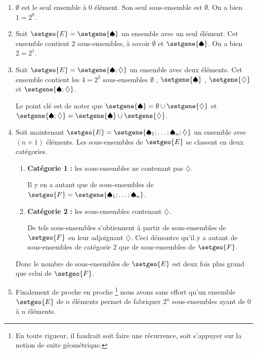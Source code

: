 \documentclass[12pt]{amsart}
\begin{document}
\begin{enumerate}
	\medskip
	\item $\emptyset$ est le seul ensemble à $0$ élément. Son seul sous-ensemble est $\emptyset$. On a bien $1 = 2^0$.


	\medskip
	\item Soit $\setgeo{E} = \setgene{\spadesuit}$ un ensemble avec un seul élément. Cet ensemble contient $2$ sous-ensembles, à savoir $\emptyset$ et $\setgene{\spadesuit}$. On a bien $2 = 2^1$.


	\medskip
	\item Soit $\setgeo{E} = \setgene{\spadesuit ; \diamondsuit}$ un ensemble avec deux éléments.
	      Cet ensemble contient les $4 = 2^2$ sous-ensembles
	      $\emptyset$ , $\setgene{\spadesuit}$ ,
	      $\setgene{\diamondsuit}$ et $\setgene{\spadesuit ; \diamondsuit}$.

	      \noindent
	      Le point clé est de noter que
	      $\setgene{\spadesuit} = \emptyset \cup \setgene{\diamondsuit}$ et
	      $\setgene{\spadesuit ; \diamondsuit} = \setgene{\spadesuit} \cup \setgene{\diamondsuit}$.

	\medskip
	\item Soit maintenant $\setgeo{E} = \setgene{\spadesuit_1 ; \dots ; \spadesuit_n ; \diamondsuit}$ un ensemble avec $(n+1)$ éléments.
		  Les sous-ensembles de $\setgeo{E}$ se classent en deux catégories.

		  \begin{enumerate}
		  		\smallskip
				\item \textbf{Catégorie 1 :} les sous-ensembles ne contenant pas $\diamondsuit$.

				      \smallskip

				      Il y en a autant que de sous-ensembles de $\setgeo{F} = \setgene{\spadesuit_1 ; \dots ; \spadesuit_{n}}$.

				\smallskip
				\item \textbf{Catégorie 2 :} les sous-ensembles contenant $\diamondsuit$.

				      \smallskip

				      De tels sous-ensembles s'obtiennent à partir de sous-ensembles de $\setgeo{F}$ en leur adjoignant $\diamondsuit$.
				      Ceci démontre qu'il y a autant de sous-ensembles de catégorie 2 que de sous-ensembles de $\setgeo{F}$.
		  \end{enumerate}

		  \noindent
		  Donc le nombre de sous-ensembles de $\setgeo{E}$ est deux fois plus grand que celui de $\setgeo{F}$.


	\medskip
	\item Finalement de proche en proche
	\footnote{
		En toute rigueur, il faudrait soit faire une récurrence, soit s'appuyer sur la notion de suite géométrique.
	}
	nous avons sans effort qu'un ensemble $\setgeo{E}$ de $n$ éléments permet de fabriquer $2^n$ sous-ensembles ayant de $0$ à $n$ éléments.
\end{enumerate}
\end{document}
